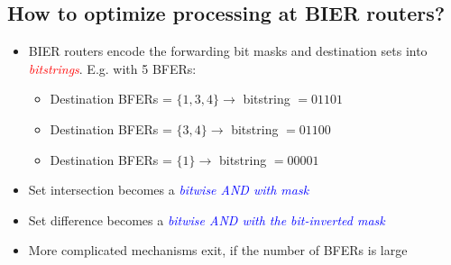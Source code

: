 \documentclass[11pt]{article}
\begin{document}
\subsection*{How to optimize processing at BIER routers?}
\begin{itemize}
	\item BIER routers encode the forwarding bit masks and destination sets into \textcolor{red}{\textit{bitstrings}}. E.g. with 5 BFERs:
		\begin{itemize}
			\item Destination BFERs = $\{1,3,4\} \rightarrow$ bitstring $ = 01101$
			\item  Destination BFERs = $\{3,4\} \rightarrow$ bitstring $ = 01100$
			\item  Destination BFERs = $\{1\} \rightarrow$ bitstring $ = 00001$	
		\end{itemize}
		
	\item Set intersection becomes a \textcolor{blue}{\textit{bitwise AND with mask}}
	\item Set difference becomes a \textcolor{blue}{\textit{bitwise AND with the bit-inverted mask}}
	\item More complicated mechanisms exit, if the number of BFERs is large
\end{itemize}
\end{document}
